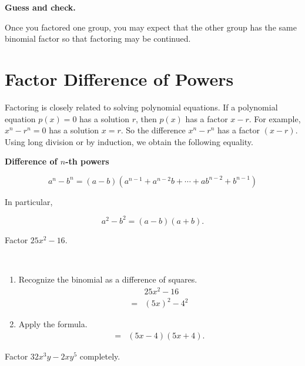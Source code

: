 \documentclass[en,11pt]{elegantbook}
\newcommand{\size}[2]{{\fontsize{#1}{0}\selectfont#2}}
\newenvironment{rmdtip}{
	\vspace*{0.5\baselineskip}
	\par\noindent
	\makebox[-3pt][r]{\color{red!90}\size{12}{\HandRight}\,\,}
    \begin{tcolorbox}[
    enhanced,
    title={\textbf{\color{second}Tips}},
    title style={left color=blue!10!green!20!white,right color=yellow!20!blue!20!white},
    colback=cyan!10!white,
    ]
    \sffamily
}{
    \end{tcolorbox}
    \par\ignorespacesafterend
}
\let\BeginKnitrBlock\begin \let\EndKnitrBlock\end
\begin{document}
\begin{rmdtip}

\textbf{Guess and check.}

Once you factored one group, you may expect that the other group has the same binomial factor so that factoring may be continued.

\end{rmdtip}

\hypertarget{factor-difference-of-powers}{%
\section{Factor Difference of Powers}\label{factor-difference-of-powers}}

Factoring is closely related to solving polynomial equations. If a polynomial equation \(p(x)=0\) has a solution \(r\), then \(p(x)\) has a factor \(x-r\). For example, \(x^n-r^n=0\) has a solution \(x=r\). So the difference \(x^n-r^n\) has a factor \((x-r)\). Using long division or by induction, we obtain the following equality.

\textbf{Difference of \(n\)-th powers}

\[a^n-b^n=(a-b)(a^{n-1}+a^{n-2}b+\cdots +ab^{n-2}+b^{n-1})\]

In particular,

\[a^2-b^2=(a-b)(a+b).\]

\BeginKnitrBlock{example}
\protect\hypertarget{exm:unnamed-chunk-14}{}{\label{exm:unnamed-chunk-14} }
Factor \(25x^2-16\).
\EndKnitrBlock{example}

\BeginKnitrBlock{solution}
{}\\

\begin{enumerate}
\def\labelenumi{\arabic{enumi}.}

\item
  Recognize the binomial as a difference of squares.
  \[\begin{aligned}
  &25x^2-16\\
  =&(5x)^2-4^2
  \end{aligned}
  \]
\item
  Apply the formula.
  \[
  \begin{aligned}
  =&(5x-4)(5x+4).
  \end{aligned}
  \]
\end{enumerate}
\EndKnitrBlock{solution}

\BeginKnitrBlock{example}
\protect\hypertarget{exm:unnamed-chunk-16}{}{\label{exm:unnamed-chunk-16} }
Factor \(32x^3y-2xy^5\) completely.
\EndKnitrBlock{example}
\end{document}

